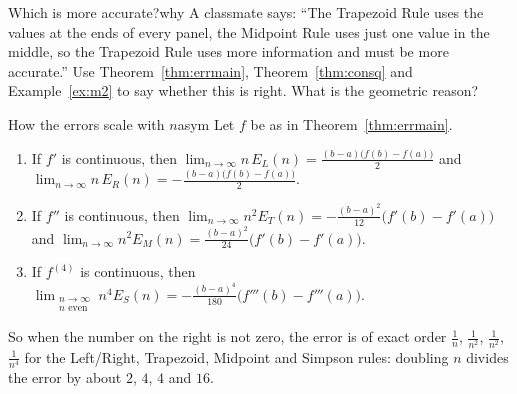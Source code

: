 \documentclass[11pt]{article}
\begin{document}
\begin{think}{Which is more accurate?}{why}
A classmate says: ``The Trapezoid Rule uses the values at the ends of every panel, the Midpoint Rule uses just one value in the middle, so the Trapezoid Rule uses more information and must be more accurate.'' Use Theorem~\ref{thm:errmain}, Theorem~\ref{thm:consq} and Example~\ref{ex:m2} to say whether this is right. What is the geometric reason?
\end{think}

\begin{thm}{How the errors scale with $n$}{asym}
Let $f$ be as in Theorem~\ref{thm:errmain}.
\begin{enumerate}[label=(\arabic*),leftmargin=*]
  \item If $f'$ is continuous, then $\displaystyle\lim_{n\to\infty}n\,E_L(n)=\frac{(b-a)\big(f(b)-f(a)\big)}2$ and $\displaystyle\lim_{n\to\infty}n\,E_R(n)=-\frac{(b-a)\big(f(b)-f(a)\big)}2$.
  \item If $f''$ is continuous, then $\displaystyle\lim_{n\to\infty}n^2E_T(n)=-\frac{(b-a)^2}{12}\big(f'(b)-f'(a)\big)$ and $\displaystyle\lim_{n\to\infty}n^2E_M(n)=\frac{(b-a)^2}{24}\big(f'(b)-f'(a)\big)$.
  \item If $f^{(4)}$ is continuous, then $\displaystyle\lim_{\substack{n\to\infty\\n\text{ even}}}n^4E_S(n)=-\frac{(b-a)^4}{180}\big(f'''(b)-f'''(a)\big)$.
\end{enumerate}
So when the number on the right is not zero, the error is of exact order $\frac1n$, $\frac1{n^2}$, $\frac1{n^2}$, $\frac1{n^4}$ for the Left/Right, Trapezoid, Midpoint and Simpson rules: doubling $n$ divides the error by about $2$, $4$, $4$ and $16$.
\end{thm}
\end{document}
